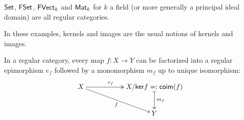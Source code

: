 \begin{example}
$\mathsf{Set}$, $\mathsf{FSet}$, $\mathsf{FVect}_k$ and  $\mathsf{Mat}_k$ for $k$ a field (or more generally a principal ideal domain) are all regular categories.

In these examples, kernels and images are the usual notions of kernels and images.
\end{example}
\begin{lemma}
\label{lem:epimono}
In a regular category, every map $f:X\to Y$ can be factorized into a regular epimorphism $e_f$ followed by a monomorphism $m_f$ up to unique isomorphism:
$$
\xymatrix{
X \ar@{->>}[rr]^{\hspace*{-.7cm}e_f} \ar[drr]_{f} &&{X/\ker{f}=:\co\im(f)} \ar@{>->}[d]^{m_f}\\
                                        &&Y
}
$$
\end{lemma}
